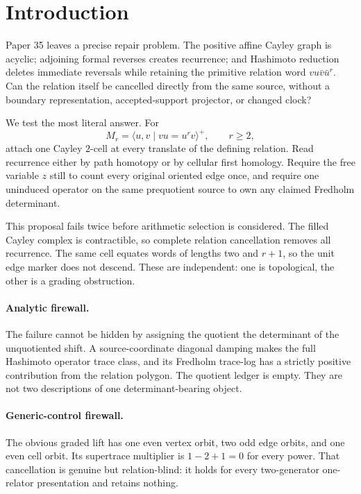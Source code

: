 \section{Introduction}
\label{sec:introduction}

Paper 35 leaves a precise repair problem.  The positive affine Cayley graph
is acyclic; adjoining formal reverses creates recurrence; and Hashimoto
reduction deletes immediate reversals while retaining the primitive relation
word $vu\bar v\bar u^r$.  Can the relation itself be cancelled directly from
the same source, without a boundary representation, accepted-support
projector, or changed clock?

We test the most literal answer.  For
\[
M_r=\langle u,v\mid vu=u^rv\rangle^+,
\qquad r\ge2,
\]
attach one Cayley $2$-cell at every translate of the defining relation.  Read
recurrence either by path homotopy or by cellular first homology.  Require the
free variable $z$ still to count every original oriented edge once, and require
one uninduced operator on the same prequotient source to own any claimed
Fredholm determinant.

This proposal fails twice before arithmetic selection is considered.  The
filled Cayley complex is contractible, so complete relation cancellation
removes all recurrence.  The same cell equates words of lengths two and
$r+1$, so the unit edge marker does not descend.  These are independent:
one is topological, the other is a grading obstruction.

\paragraph{Analytic firewall.}
The failure cannot be hidden by assigning the quotient the determinant of the
unquotiented shift.  A source-coordinate diagonal damping makes the full
Hashimoto operator trace class, and its Fredholm trace-log has a strictly
positive contribution from the relation polygon.  The quotient ledger is
empty.  They are not two descriptions of one determinant-bearing object.

\paragraph{Generic-control firewall.}
The obvious graded lift has one even vertex orbit, two odd edge orbits, and
one even cell orbit.  Its supertrace multiplier is $1-2+1=0$ for every power.
That cancellation is genuine but relation-blind: it holds for every
two-generator one-relator presentation and retains nothing.

